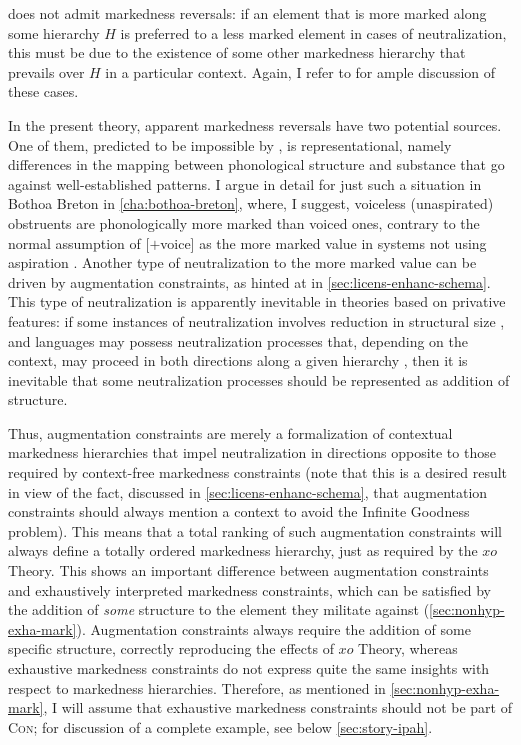  does not admit markedness reversals: if an element that is more marked along some hierarchy $H$ is preferred to a less marked element in cases of neutralization, this must be due to the existence of some other markedness hierarchy that prevails over $H$ in a particular context. Again, I refer to \citet{delacy2006} for ample discussion of these cases.

In the present theory, apparent markedness reversals have two potential sources. One of them, predicted to be impossible by \citet{delacy2006}, is representational, namely differences in the mapping between phonological structure and substance that go against well\hyp established patterns. I argue in detail for just such a situation in Bothoa Breton in \cref{cha:bothoa-breton}, where, I suggest, voiceless (unaspirated) obstruents are phonologically more marked than voiced ones, contrary to the normal assumption of [$+$voice] as the more marked value in systems not using aspiration \citep[\cfm][]{honeybone05,petrova06:_voice,harris09:_why_final_obstr_devoic_is_weaken}. Another type of neutralization to the more marked value can be driven by augmentation constraints, as hinted at in \cref{sec:licens-enhanc-schema}. This type of neutralization is apparently inevitable in theories based on privative features: if some instances of neutralization involves reduction in structural size \citep[\egm][]{harris97:_licen_inher}, and languages may possess neutralization processes that, depending on the context, may proceed in both directions along a given hierarchy \citep{delacy2006}, then it is inevitable that some neutralization processes should be represented as addition of structure.

Thus, augmentation constraints are merely a formalization of contextual markedness hierarchies that impel neutralization in directions opposite to those required by context\hyp free markedness constraints (note that this is a desired result in view of the fact, discussed in \cref{sec:licens-enhanc-schema}, that augmentation constraints should always mention a context to avoid the Infinite Goodness problem). This means that a total ranking of such augmentation constraints will always define a totally ordered markedness hierarchy, just as required by the $xo$ Theory. This shows an important difference between augmentation constraints and exhaustively interpreted markedness constraints, which can be satisfied by the addition of \emph{some} structure to the element they militate against (\cref{sec:nonhyp-exha-mark}). Augmentation constraints always require the addition of some specific structure, correctly reproducing the effects of  $xo$ Theory, whereas exhaustive markedness constraints do not express quite the same insights with respect to markedness hierarchies. Therefore, as mentioned in \cref{sec:nonhyp-exha-mark}, I will assume that exhaustive markedness constraints should not be part of \textsc{Con}; for discussion of a complete example, see below \cref{sec:story-ipah}.

